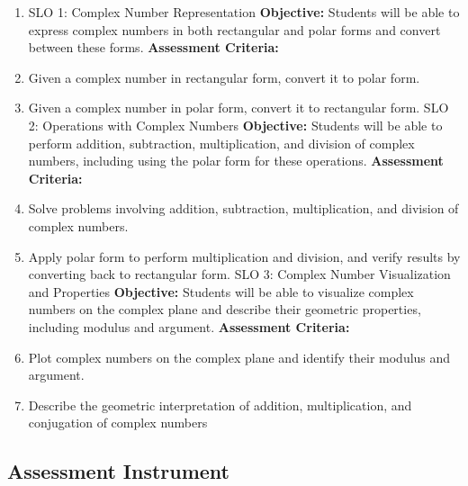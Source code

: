 \begin{enumerate}
    \item SLO 1: Complex Number Representation \textbf{Objective:} Students will be able to express complex numbers in both rectangular and polar forms and convert between these forms. \textbf{Assessment Criteria:}
    \item Given a complex number in rectangular form, convert it to polar form.
    \item Given a complex number in polar form, convert it to rectangular form. SLO 2: Operations with Complex Numbers \textbf{Objective:} Students will be able to perform addition, subtraction, multiplication, and division of complex numbers, including using the polar form for these operations. \textbf{Assessment Criteria:}
    \item Solve problems involving addition, subtraction, multiplication, and division of complex numbers.
    \item Apply polar form to perform multiplication and division, and verify results by converting back to rectangular form. SLO 3: Complex Number Visualization and Properties \textbf{Objective:} Students will be able to visualize complex numbers on the complex plane and describe their geometric properties, including modulus and argument. \textbf{Assessment Criteria:}
    \item Plot complex numbers on the complex plane and identify their modulus and argument.
    \item Describe the geometric interpretation of addition, multiplication, and conjugation of complex numbers
\end{enumerate}

\subsection{Assessment Instrument}

